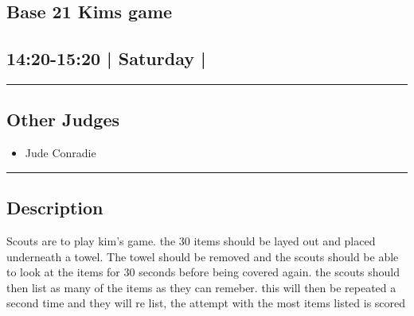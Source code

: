 \documentclass[10pt, A5]{article}
\begin{document}
		\begin{framed}
			\begin{minipage}{\textwidth}

			\setcounter{section}{50}
							\section{\faStar \: Base 21 \faStar \: Kims game}
						
			\subsection*{14:20-15:20 | Saturday | }

			\vspace{0.25cm}
			\hrule
			\vspace{0.25cm}


			\subsection*{Other Judges}
							

				\begin{multicols}{2}

			\begin{itemize}
											\item Jude Conradie
								\end{itemize}

			\vfill\null
			\columnbreak

			\begin{itemize}
								\end{itemize}

			\vfill\null

			\end{multicols}

			\vspace{0.25cm}
			\hrule
			\vspace{0.25cm}

			\begin{minipage}{\textwidth}
			\subsection*{\faListAlt \: Description}
			Scouts are to play kim's game. the 30 items should be layed out and placed underneath a towel. The towel should be removed and the scouts should be able to look at the items for 30 seconds before being covered again. the scouts should then list as many of the items as they can remeber.  this will then be repeated a second time and they will re list, the attempt with the most items listed is scored 
			\end{minipage}


	\end{minipage}
	\end{framed}
\end{document}
